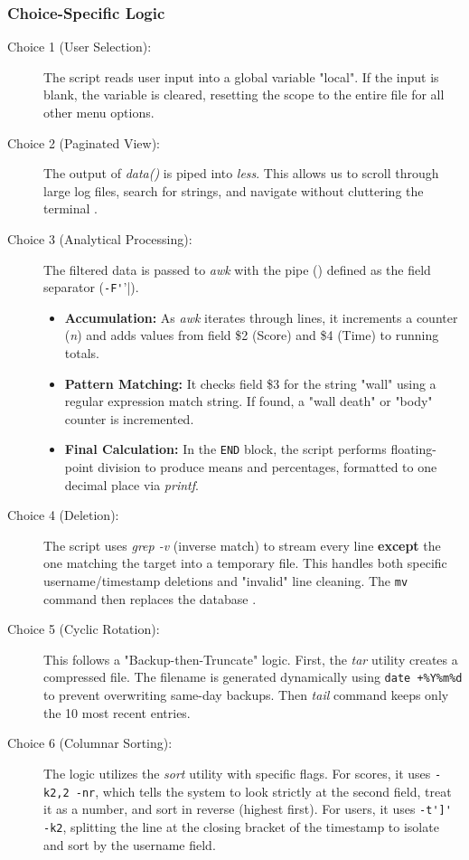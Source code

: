 \documentclass[12pt, letterpaper]{article}
\begin{document}
    \subsubsection*{Choice-Specific Logic}

    \begin{description}
        \item[Choice 1 (User Selection):] The script reads user input into a global variable "local". If the input is blank, the variable is cleared, resetting the scope to the entire file for all other menu options.
        \item[Choice 2 (Paginated View):] The output of \textit{data()} is piped into \textit{less}. This allows us to scroll through large log files, search for strings, and navigate without cluttering the terminal .

        \item[Choice 3 (Analytical Processing):] The filtered data is passed to \textit{awk} with the pipe (\textbar) defined as the field separator (\verb|-F'|'|).
        \begin{itemize}
            \item \textbf{Accumulation:} As \textit{awk} iterates through lines, it increments a counter (\textit{n}) and adds values from field \$2 (Score) and \$4 (Time) to running totals.
            \item \textbf{Pattern Matching:} It checks field \$3 for the string "wall" using a regular expression match string. If found, a "wall death" or "body" counter is incremented.
            \item \textbf{Final Calculation:} In the \verb|END| block, the script performs floating-point division to produce means and percentages, formatted to one decimal place via \textit{printf}.
    \end{itemize}

    \item[Choice 4 (Deletion):] The script uses \textit{grep -v} (inverse match) to stream every line \textbf{except} the one matching the target into a temporary file. This handles both specific username/timestamp deletions and "invalid" line cleaning. The \verb|mv| command then replaces the database .

    \item[Choice 5 (Cyclic Rotation):] This follows a "Backup-then-Truncate" logic. First, the \textit{tar} utility creates a compressed file. The filename is generated dynamically using \verb|date +%Y%m%d| to prevent overwriting same-day backups. Then \textit{tail} command keeps only the 10 most recent entries.

    \item[Choice 6 (Columnar Sorting):] The logic utilizes the \textit{sort} utility with specific flags. For scores, it uses \verb|-k2,2 -nr|, which tells the system to look strictly at the second field, treat it as a number, and sort in reverse (highest first). For users, it uses \verb|-t']' -k2|, splitting the line at the closing bracket of the timestamp to isolate and sort by the username field.
\end{description}
\end{document}
